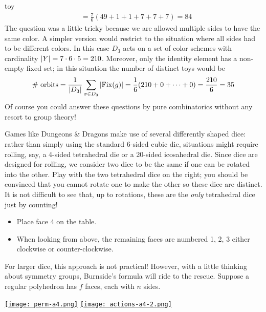 \begin{example}{}{toy}
\begin{align*}
&=\frac 76(49+1+1+7+7+7)=84
\end{align*}
The question was a little tricky because we are allowed multiple sides to have the same color. A simpler version would restrict to the situation where all sides had to be different colors. In this case $D_3$ acts on a set of color schemes with cardinality $\left| Y\right|=7\cdot 6\cdot 5=210$. Moreover, only the identity element has a non-empty fixed set; in this situation the number of distinct toys would be
\[\text{\# orbits}=\frac 1{\left| D_3\right|}\sum_{\sigma\in D_3}\left| \operatorname{Fix}(g)\right|=\frac 16(210+0+\cdots+0)=\frac{210}6=35\]
Of course you could answer these questions by pure combinatorics without any resort to group theory!
\end{example}

\goodbreak


\begin{minipage}[t]{0.69\linewidth}\vspace{-10pt}
Games like Dungeons \& Dragons make use of several differently shaped dice: rather than simply using the standard 6-sided cubic die, situations might require rolling, say, a 4-sided tetrahedral die or a 20-sided icosahedral die.\smallbreak
Since dice are designed for rolling, we consider two dice to be the same if one can be rotated into the other. Play with the two tetrahedral dice on the right; you should be convinced that you cannot rotate one to make the other so these dice are distinct.\smallbreak
It is not difficult to see that, up to rotations, these are the \emph{only} tetrahedral dice just by counting!
\begin{itemize}
  \item Place face 4 on the table.
  \item When looking from above, the remaining faces are numbered 1, 2, 3 either clockwise or counter-clockwise. 
\end{itemize}
For larger dice, this approach is not practical! However, with a little thinking about symmetry groups, Burnside's formula will ride to the rescue.\smallbreak
Suppose a regular polyhedron has $f$ faces, each with $n$ sides.
\end{minipage}\hfill\begin{minipage}[t]{0.3\linewidth}\vspace{-20pt}
\flushright
	\href{https://www.math.uci.edu/~ndonalds/math120a/perm-a4.html}{\texttt{[image: perm-a4.png]}}\bigbreak
  \href{https://www.math.uci.edu/~ndonalds/math120a/actions-a4-2.html}{\texttt{[image: actions-a4-2.png]}}
\end{minipage}\par

